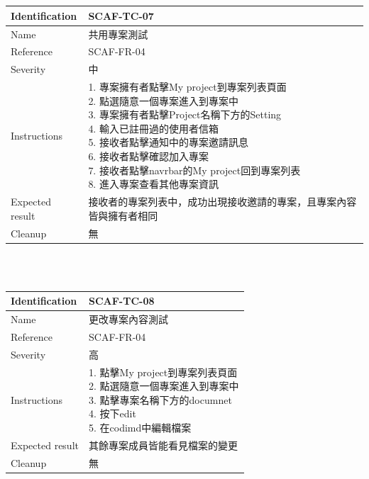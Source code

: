 \documentclass{report}
\begin{document}
\\
\newline
\\
\begin{tabularx}{\textwidth}{
  |p{}%
  |p{}|%
  }
  \hline
  \centering Identification &  SCAF-TC-07 \\
  \hline
  \centering Name & 共用專案測試 \\
  \hline
  \centering Reference & SCAF-FR-04 \\
  \hline
  \centering Severity & 中 \\
  \hline
  \centering Instructions & 
  \makecell[l]{
    1. 專案擁有者點擊My project到專案列表頁面 \\
    2. 點選隨意一個專案進入到專案中 \\
    3. 專案擁有者點擊Project名稱下方的Setting \\
    4. 輸入已註冊過的使用者信箱 \\
    5. 接收者點擊通知中的專案邀請訊息 \\
    6. 接收者點擊確認加入專案 \\
    7. 接收者點擊navrbar的My project回到專案列表 \\
    8. 進入專案查看其他專案資訊
  }\\
  \hline
  \centering Expected result & 接收者的專案列表中，成功出現接收邀請的專案，且專案內容皆與擁有者相同 \\
  \hline
  \centering Cleanup & 無 \\
  \hline
\end{tabularx}
\\
\newline
\\
\begin{tabularx}{\textwidth}{
  |p{}%
  |p{}|%
  }
  \hline
  \centering Identification &  SCAF-TC-08 \\
  \hline
  \centering Name & 更改專案內容測試 \\
  \hline
  \centering Reference & SCAF-FR-04 \\
  \hline
  \centering Severity & 高 \\
  \hline
  \centering Instructions & 
  \makecell[l]{
    1. 點擊My project到專案列表頁面 \\
    2. 點選隨意一個專案進入到專案中 \\
    3. 點擊專案名稱下方的documnet \\
    4. 按下edit \\
    5. 在codimd中編輯檔案
  }\\
  \hline
  \centering Expected result & 其餘專案成員皆能看見檔案的變更 \\
  \hline
  \centering Cleanup & 無 \\
  \hline
\end{tabularx}
\end{document}
